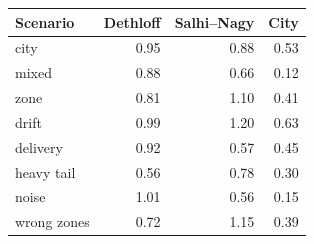 \begin{tabular}{lrrr}
\toprule
Scenario & Dethloff & Salhi--Nagy & City \\
\midrule
city & 0.95 & 0.88 & 0.53 \\
mixed & 0.88 & 0.66 & 0.12 \\
zone & 0.81 & 1.10 & 0.41 \\
drift & 0.99 & 1.20 & 0.63 \\
delivery & 0.92 & 0.57 & 0.45 \\
heavy tail & 0.56 & 0.78 & 0.30 \\
noise & 1.01 & 0.56 & 0.15 \\
wrong zones & 0.72 & 1.15 & 0.39 \\
\bottomrule
\end{tabular}
